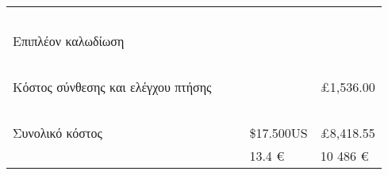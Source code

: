 \documentclass[a4paper, 12pt, twoside]{report}
\begin{document}
\begin{landscape}
\begin{longtable}{ m{3cm} m{2.2cm} m{2.2cm} m{2.2cm} m{2.2cm} }
				~\\
				Επιπλέον καλωδίωση & & & & \\
				\hdashline
				~\\
				Κόστος σύνθεσης και ελέγχου πτήσης & & & & £1,536.00\\
				\hline
				~\\
				Συνολικό κόστος & & & \$17.500US & £8,418.55\\
				& & & 13.4 \euro & 10 486 \euro\\
				\hline
		\end{longtable}
		\end{landscape}
	

	\cleardoublepage
	\label{κεφ.:Βιβλιογραφία}
	\printbibliography[title={Βιβλιογραφία}]
	
\end{document}
